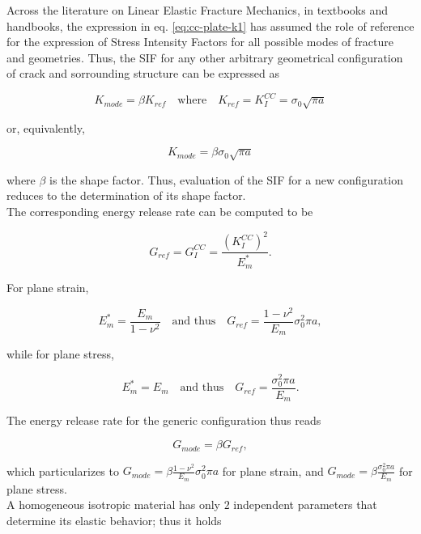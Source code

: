 \documentclass[a4paper]{jpconf}
\begin{document}
Across the literature on Linear Elastic Fracture Mechanics, in textbooks and handbooks, the expression in eq. \ref{eq:cc-plate-k1} has assumed the role of reference for the expression of Stress Intensity Factors for all possible modes of fracture and geometries. Thus, the SIF for any other arbitrary geometrical configuration of crack and sorrounding structure can be expressed as

\begin{equation}
K_{mode} = \beta K_{ref}\quad\text{where}\quad K_{ref}=K_{I}^{CC}=\sigma_{0}\sqrt{\pi a}
\end{equation}

or, equivalently,

\begin{equation}
K_{mode} = \beta\sigma_{0}\sqrt{\pi a}
\end{equation}

where $\beta$ is the shape factor. Thus, evaluation of the SIF for a new configuration reduces to the determination of its shape factor.\\
The corresponding energy release rate can be computed to be

\begin{equation}\label{eq:gcentralcrackedplate}
G_{ref}=G_{I}^{CC}=\frac{\left(K_{I}^{CC}\right)^{2}}{E_{m}^{*}}.
\end{equation}

For plane strain,

\begin{equation}\label{eq:gcentralcrackedplateplanestrain}
E_{m}^{*}=\frac{E_{m}}{1-\nu^{2}}\quad\text{and thus}\quad G_{ref}=\frac{1-\nu^{2}}{E_{m}}\sigma_{0}^{2}\pi a,
\end{equation}

while for plane stress,

\begin{equation}
E_{m}^{*}=E_{m}\quad\text{and thus}\quad G_{ref}=\frac{\sigma_{0}^{2}\pi a}{E_{m}}.
\end{equation}

The energy release rate for the generic configuration thus reads

\begin{equation}
G_{mode}=\beta G_{ref},
\end{equation}

which particularizes to $G_{mode}=\beta\frac{1-\nu^{2}}{E_{m}}\sigma_{0}^{2}\pi a $ for plane strain, and $ G_{mode}=\beta\frac{\sigma_{0}^{2}\pi a}{E_{m}} $ for plane stress.\\
A homogeneous isotropic material has only $2$ independent parameters that determine its elastic behavior; thus it holds
\end{document}

